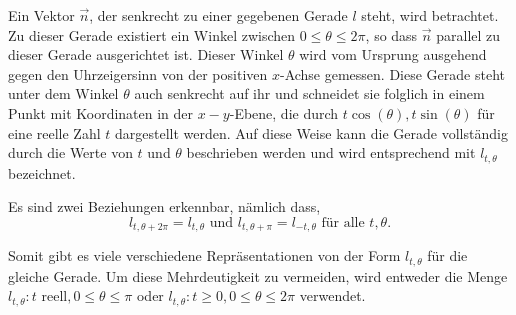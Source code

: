 Ein Vektor $\vec{n}$, der senkrecht zu einer gegebenen Gerade $l$ steht, wird betrachtet. Zu dieser Gerade existiert ein Winkel zwischen $0 \le \theta \le 2\pi$, so dass $\vec{n}$ parallel zu dieser Gerade ausgerichtet ist. Dieser Winkel $\theta$ wird vom Ursprung ausgehend gegen den Uhrzeigersinn von der positiven $x$-Achse gemessen. Diese Gerade steht unter dem Winkel $\theta$ auch senkrecht auf ihr und schneidet sie folglich in einem Punkt mit Koordinaten in der $x-y$-Ebene, die durch $t\cos(\theta), t\sin(\theta)$ für eine reelle Zahl $t$ dargestellt werden. Auf diese Weise kann die Gerade vollständig durch die Werte von $t$ und $\theta$ beschrieben werden und wird entsprechend mit $l_{t,\theta}$ bezeichnet.

Es sind zwei Beziehungen erkennbar, nämlich dass,
\begin{equation}
	l_{t,\theta+2\pi} = l_{t,\theta} \text{ und } l_{t,\theta+\pi} = l_{-t,\theta} \text{ für alle } t, \theta.
\nonumber\end{equation}

\sloppy Somit gibt es viele verschiedene Repräsentationen von der Form $l_{t,\theta}$ für die gleiche Gerade. Um diese Mehrdeutigkeit zu vermeiden, wird entweder die Menge $l_{t,\theta} : t \text{ reell},  0 \le \theta \le \pi$ oder $l_{t,\theta} : t \ge 0,  0 \le \theta \le 2\pi$ verwendet.


